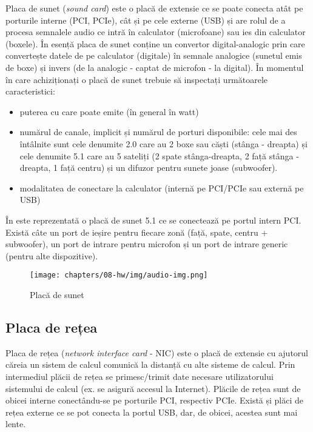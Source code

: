 Placa de sunet (\textit{sound card}) este o placă de extensie ce se poate conecta atât pe porturile
interne (PCI, PCIe), cât și pe cele externe (USB) și are rolul de a procesa
semnalele audio ce intră în calculator (microfoane) sau ies din calculator
(boxele). În esență placa de sunet conține un convertor digital-analogic prin
care convertește datele de pe calculator (digitale) în semnale analogice
(sunetul emis de boxe) și invers (de la analogic - captat de microfon - la
digital). În momentul în care achiziționați o placă de sunet trebuie să
inspectați următoarele caracteristici:

\begin{itemize}
	\item puterea cu care poate emite (în general în watt)
	\item numărul de canale, implicit și numărul de porturi disponibile:
		cele mai des întâlnite sunt cele denumite 2.0 care au 2 boxe sau
		căști (stânga - dreapta) și cele denumite 5.1 care au 5 sateliți (2
		spate stânga-dreapta, 2 față stânga - dreapta, 1 față centru) și un difuzor
		pentru sunete joase (subwoofer).
	\item modalitatea de conectare la calculator (internă pe PCI/PCIe sau
		externă pe USB)
\end{itemize}

În  este reprezentată o placă de sunet 5.1
ce se conectează pe portul intern PCI. Există câte un port de ieșire pentru
fiecare zonă (față, spate, centru + subwoofer), un port de intrare pentru microfon și un
port de intrare generic (pentru alte dispozitive).

\begin{figure}[!htbp]
	\centering
	\texttt{[image: chapters/08-hw/img/audio-img.png]}
	\caption{Placă de sunet\protect\footnotemark}
	\label{fig:hw:audio}
\end{figure}


\subsection{Placa de rețea}
\label{sec:hw:extension:nic}

Placa de rețea (\textit{network interface card} - NIC) este o placă de extensie cu ajutorul căreia un sistem de calcul
comunică la distanță cu alte sisteme de calcul. Prin intermediul plăcii de rețea
se primesc/trimit date necesare utilizatorului sistemului de calcul (ex. se
asigură accesul la Internet). Plăcile de rețea sunt de obicei interne
conectându-se pe porturile PCI, respectiv PCIe. Există și plăci de rețea externe
ce se pot conecta la portul USB, dar, de obicei, acestea sunt mai lente.

